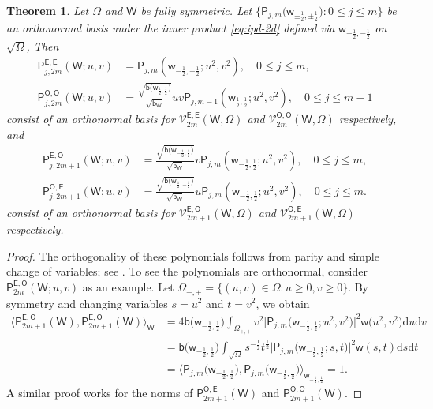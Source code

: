 \documentclass{amsart}
\newtheorem{thm}{Theorem}[section]
\theoremstyle{remark}
\def\d{\mathrm{d}}
\def\sb{{\mathsf b}}
\def\sw{{\mathsf w}}
\def\sE{{\mathsf E}}
\def\sO{{\mathsf O}}
\def\sP{{\mathsf P}}
\def\sW{{\mathsf W}}
\def\CV{{\mathcal V}}
\def\f{\frac}
\begin{document}
\begin{thm} \label{thm:FullSymB2}
Let $\Omega$ and $\sW$ be fully symmetric. Let $\{\sP_{j,m}\big(\sw_{\pm \f12, \pm \f12}\big): 0 \le j \le m\}$ 
be an orthonormal basis under the inner product \eqref{eq:ipd-2d} defined via
$\sw_{\pm \f12, -\f12}$ on $\sqrt{\Omega}$, %
Then 
\begin{align*}
    \sP_{j,2m}^{\sE,\sE}(\sW; u,v) & = \sP_{j,m}\left(\sw_{-\f12, -\f12}; u^2,v^2 \right), \quad 0 \le j \le m,\\
    \sP_{j,2m}^{\sO,\sO}(\sW; u,v) & = \frac{\sqrt{\sb\big(\sw_{\f12, \f12}\big)}}{\sqrt{\sb_\sW}} 
       u v \sP_{j,m-1}\left(\sw_{\f12, \f12}; u^2,v^2\right),  \quad 0 \le j \le m-1
 \end{align*}
consist of an orthonormal basis for  $\CV_{2m}^{\sE,\sE} (\sW, \Omega)$ and $\CV_{2m}^{\sO,\sO} (\sW, \Omega)$ respectively,
and 
\begin{align*}
    \sP_{j,2m+1}^{\sE,\sO} (\sW; u,v) & = \frac{\sqrt{\sb\big(\sw_{-\f12, \f12}\big)}}{\sqrt{\sb_\sW}} v \sP_{j,m}\left(\sw_{-\f12, \f12}; u^2,v^2\right), \quad 0 \le j \le m, \\
    \sP_{j,2m+1}^{\sO,\sE} (\sW; u,v) & = \frac{\sqrt{\sb\big(\sw_{\f12, -\f12}\big)}}{\sqrt{\sb_\sW}} u \sP_{j,m}\left(\sw_{-\f12, \f12}; u^2,v^2\right),
    \quad 0 \le j \le m.
 \end{align*}
consist of an orthonormal basis for  $\CV_{2m+1}^{\sE,\sO} (\sW, \Omega)$ and $\CV_{2m+1}^{\sO,\sE}(\sW, \Omega)$
respectively.
\end{thm} 

\begin{proof}
The orthogonality of these polynomials follows from parity and simple change of variables; see \cite[Theorem 4.2]{X24}. 
To see the polynomials are orthonormal, consider $\sP_{2m}^{\sE,\sO}(\sW; u,v)$ as an example. Let 
$\Omega_{+,+} = \{(u,v) \in \Omega: u \ge 0, v \ge 0\}$. By symmetry and changing variables $s = u^2$ and $t=v^2$, 
we obtain
\begin{align*}
   \Big \langle \sP_{2m+1}^{\sE,\sO}(\sW),  \sP_{2m+1}^{\sE,\sO}(\sW) \Big \rangle_{\sW}  
   &=  4 \sb \big(\sw_{-\f12, \f12}\big)\int_{\Omega_{+,+}} v^2 \Big | \sP_{j,m}\Big(\sw_{-\f12, \f12}; u^2,v^2\Big)\Big|^2 \sw\big(u^2,v^2\big) \d u \d v  \\
 & =  \sb\big(\sw_{-\f12, \f12}\big) \int_{\sqrt{\Omega}} s^{-\f12} t^{\f12} \Big | \sP_{j,m}\Big(\sw_{-\f12, \f12}; s,t\Big) \Big|^2 \sw(s,t)
   \d s \d t   \\  
  & =   \Big \langle  \sP_{j,m}\Big(\sw_{-\f12, \f12}\Big), \sP_{j,m}\Big(\sw_{-\f12, \f12})\Big \rangle_{\sw_{-\f12, \f12}} = 1.  
\end{align*}
A similar proof works for the norms of $\sP_{2m+1}^{\sO,\sE}(\sW)$ and $\sP_{2m+1}^{\sO,\sO}(\sW)$.
\end{proof} 
\end{document}
